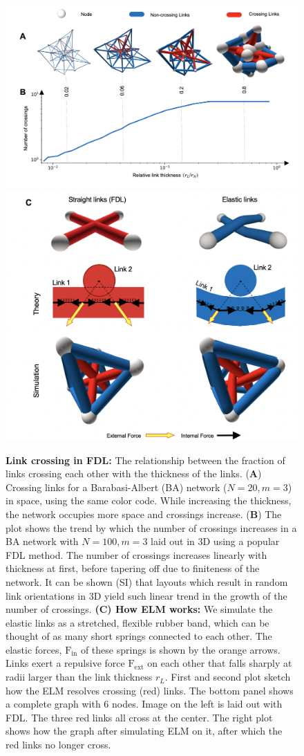 \documentclass[nofootinbib,preprint,floatfix,titlepage,endfloats]{revtex4} %
\begin{document}
\begin{figure}
    \vspace{15cm}
\end{figure}
\begin{figure}
    \centering
    \includegraphics[width=.6\columnwidth]{fig-09-19/panel-crs-3.png}
    \includegraphics[width = .6\columnwidth]{fig-09-19/elf-resolve.png}
    \caption{%
    {\scriptsize {\bf Link crossing in FDL:} The relationship between the fraction of links crossing each other with the thickness of the links. 
    ({\bf A})  Crossing links for a Barabasi-Albert (BA) network ($N = 20, m = 3$) in space, using the same color code. While increasing the thickness, the network occupies more space and crossings increase. 
    ({\bf B}) The plot shows the trend by which the number of crossings increases in a BA network with $N=100, m =3$ laid out in 3D using a popular FDL method.
    The number of crossings increases linearly with thickness at first, before tapering off due to finiteness of the network. It can be shown (SI) that layouts which result in random link orientations in 3D yield such linear trend in the growth of the number of crossings.
    {\bf(C) How ELM works:} We simulate the elastic links as a stretched, flexible rubber band, which can be thought of as many short springs connected to each other. 
    The elastic forces, $\mathrm{F}_{\mathrm{in}}$ of these springs is shown by the orange arrows.
    Links exert a repulsive force $\mathrm{F}_{\mathrm{ext}}$  on each other that falls sharply at radii larger than the link thickness $r_L$. 
    First and second plot sketch how the ELM resolves crossing (red) links. The bottom panel shows a complete graph with 6 nodes. Image on the left is laid out with FDL. The three red links all cross at the center. The right plot shows how the graph after simulating ELM on it, after which the red links no longer cross. 
    } 
    }
    
    \label{fig:crossings}
\end{figure}
\end{document}
